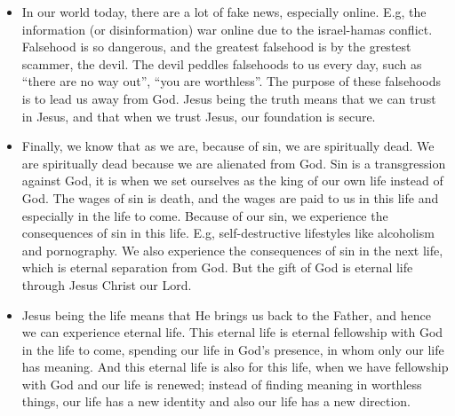 \begin{itemize}
  \item{In our world today, there are a lot of fake news, especially online. E.g, the information (or disinformation) war online due to the israel-hamas conflict. Falsehood is so dangerous, and the greatest falsehood is by the grestest scammer, the devil. The devil peddles falsehoods to us every day, such as “there are no way out”, “you are worthless”. The purpose of these falsehoods is to lead us away from God. Jesus being the truth means that we can trust in Jesus, and that when we trust Jesus, our foundation is secure. }
  \item{Finally, we know that as we are, because of sin, we are spiritually dead. We are spiritually dead because we are alienated from God. Sin is a transgression against God, it is when we set ourselves as the king of our own life instead of God. The wages of sin is death, and the wages are paid to us in this life and especially in the life to come. Because of our sin, we experience the consequences of sin in this life. E.g, self-destructive lifestyles like alcoholism and pornography. We also experience the consequences of sin in the next life, which is eternal separation from God. But the gift of God is eternal life through Jesus Christ our Lord.}
  \item{Jesus being the life means that He brings us back to the Father, and hence we can experience eternal life. This eternal life is eternal fellowship with God in the life to come, spending our life in God’s presence, in whom only our life has meaning. And this eternal life is also for this life, when we have fellowship with God and our life is renewed; instead of finding meaning in worthless things, our life has a new identity and also our life has a new direction.}
\end{itemize}